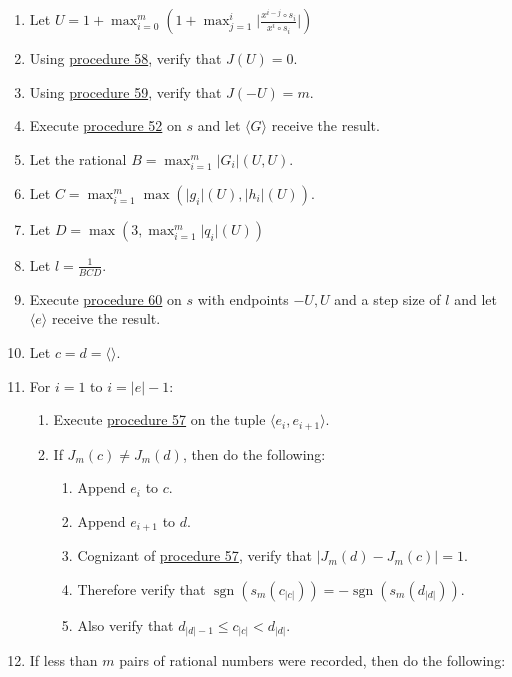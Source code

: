 \documentclass[twocolumn]{article}
\DeclareMathOperator{\sgn}{sgn}
\begin{document}
				\begin{enumerate}
					\item Let $U=1+\max_{i=0}^m\left(1+\max_{j=1}^i\lvert\frac{x^{i-j}\circ s_i}{x^i\circ s_i}\rvert\right)$
					\item Using \hyperref[sec:procedure 58]{procedure 58}, verify that $J(U)=0$.
					\item Using \hyperref[sec:procedure 59]{procedure 59}, verify that $J(-U)=m$.
					\item Execute \hyperref[sec:procedure 52]{procedure 52} on $s$ and let $\langle G\rangle$ receive the result.
					\item Let the rational $B=\max_{i=1}^m \lvert G_i\rvert(U,U)$.
					\item Let $C=\max_{i=1}^m \max(\lvert g_i\rvert(U),\lvert h_i\rvert(U))$.
					\item Let $D=\max(3, \max_{i=1}^m \lvert q_i\rvert(U))$
					\item Let $l=\frac{1}{BCD}$.
					\item Execute \hyperref[sec:procedure 60]{procedure 60} on $s$ with endpoints $-U,U$ and a step size of $l$ and let $\langle e\rangle$ receive the result.
					\item Let $c=d=\langle\rangle$.
					\item For $i=1$ to $i=\lvert e\rvert-1$:
					\begin{enumerate}
						\item Execute \hyperref[sec:procedure 57]{procedure 57} on the tuple $\langle e_i,e_{i+1}\rangle$.
						\item If $J_m(c)\ne J_m(d)$, then do the following:
						\begin{enumerate}
							\item Append $e_i$ to $c$.
							\item Append $e_{i+1}$ to $d$.
							\item Cognizant of \hyperref[sec:procedure 57]{procedure 57}, verify that $\lvert J_m(d)-J_m(c)\rvert=1$.
							\item Therefore verify that $\sgn(s_m(c_{\lvert c\rvert}))=-\sgn(s_m(d_{\lvert d\rvert}))$.
							\item Also verify that $d_{\lvert d\rvert-1}\le c_{\lvert c\rvert}<d_{\lvert d\rvert}$.
						\end{enumerate}
					\end{enumerate}
					\item If less than $m$ pairs of rational numbers were recorded, then do the following:
					\begin{enumerate}

\end{enumerate}
\end{enumerate}
\end{document}
